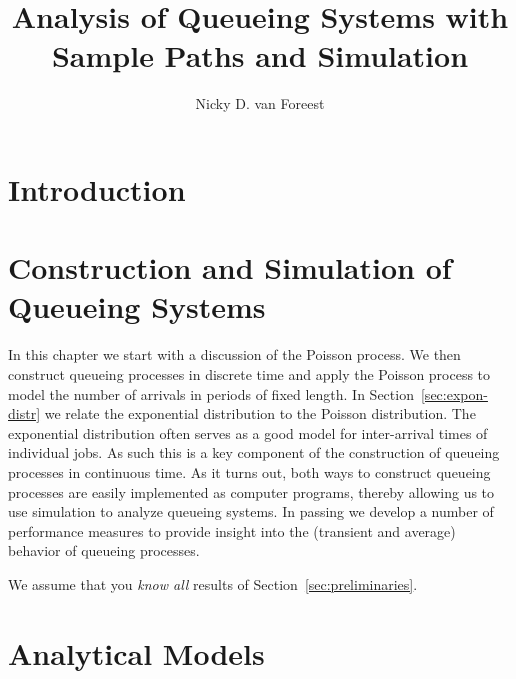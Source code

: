 \author{Nicky D. van  Foreest}
\title{Analysis of Queueing Systems with  Sample Paths and Simulation }


\frontmatter
\maketitle

\tableofcontents

\chapter{Introduction}\label{sec:introduction}



\mainmatter

\chapter{Construction and Simulation of Queueing Systems}
\label{cha:single-stat-queu}

In this chapter we start with a discussion of the Poisson process.
We then construct queueing processes in discrete time and apply the Poisson process to model the number of arrivals in periods of fixed length.
In Section~\ref{sec:expon-distr} we relate the exponential distribution to the Poisson distribution.
The exponential distribution often serves as a good model for inter-arrival times of individual jobs.
As such this is a key component of the construction of queueing processes in continuous time.
As it turns out, both ways to construct queueing processes are easily implemented as computer programs, thereby allowing us to use simulation to analyze queueing systems.
In passing we develop a number of performance measures to provide insight into the (transient and average) behavior of queueing processes.

We assume that you  \emph{know all} results of Section~\ref{sec:preliminaries}. 








\chapter{Analytical Models}
\label{cha:analytical-models}

